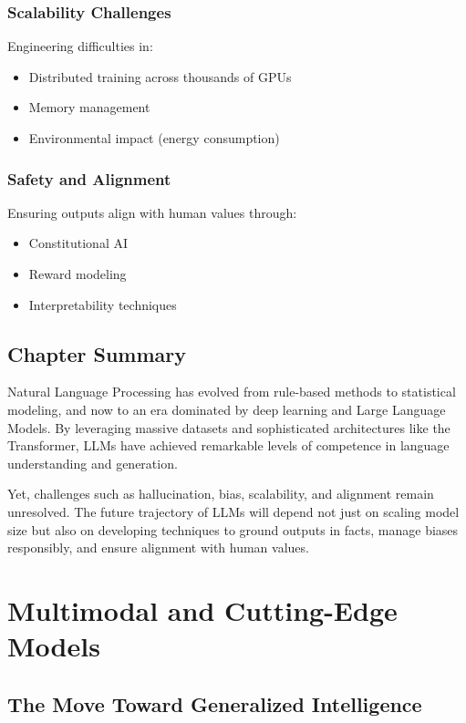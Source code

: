 \documentclass[openany]{book}
\begin{document}
\subsection{Scalability Challenges}
Engineering difficulties in:
\begin{itemize}
    \item Distributed training across thousands of GPUs
    \item Memory management
    \item Environmental impact (energy consumption)
\end{itemize}

\subsection{Safety and Alignment}
Ensuring outputs align with human values through:
\begin{itemize}
    \item Constitutional AI
    \item Reward modeling
    \item Interpretability techniques
\end{itemize}

\section{Chapter Summary}

Natural Language Processing has evolved from rule-based methods to statistical
modeling, and now to an era dominated by deep learning and Large Language 
Models. By leveraging massive datasets and sophisticated architectures like 
the Transformer, LLMs have achieved remarkable levels of competence in language 
understanding and generation.

Yet, challenges such as hallucination, bias, scalability, and alignment remain 
unresolved. The future trajectory of LLMs will depend not just on scaling model 
size but also on developing techniques to ground outputs in facts, manage biases 
responsibly, and ensure alignment with human values.

\chapter{Multimodal and Cutting-Edge Models}

\section{The Move Toward Generalized Intelligence}
\end{document}
